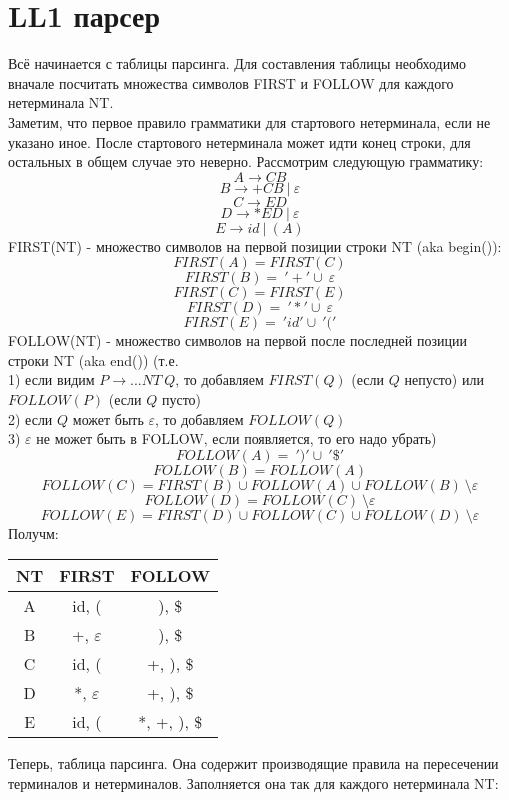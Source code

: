 \documentclass{article}
\begin{document}
\part{LL1 парсер}
Всё начинается с таблицы парсинга. Для составления таблицы необходимо вначале 
посчитать множества символов FIRST и FOLLOW для каждого нетерминала NT. 
\\Заметим, что первое правило грамматики для стартового нетерминала, 
если не указано иное. После стартового нетерминала может 
идти конец строки, для остальных в общем случае это неверно.
Рассмотрим следующую грамматику:
$$A \to CB $$
$$B \to +CB \ | \ \varepsilon $$
$$C \to ED $$
$$D \to *ED \ | \ \varepsilon$$
$$E \to id \ | \ (A)$$
FIRST(NT) - множество символов на первой позиции строки NT (aka begin()):\\
$$FIRST(A)=FIRST(C)$$
$$FIRST(B)=\ '+' \cup \ \varepsilon$$
$$FIRST(C)=FIRST(E)$$
$$FIRST(D)=\ '*' \cup \ \varepsilon$$
$$FIRST(E)=\ 'id' \cup \ '('$$
FOLLOW(NT) - множество символов на первой после последней
позиции строки NT (aka end()) (т.е.  \\ 
1) если видим $P \to ... NT \ Q$, то 
добавляем $FIRST(Q)$ (если $Q$ непусто) или $FOLLOW(P)$ (если $Q$ пусто) \\
2) если $Q$ может быть $\varepsilon$, то добавляем $FOLLOW(Q)$ \\
3) $\varepsilon$ не может быть в FOLLOW, если появляется, то его надо убрать)
$$FOLLOW(A)=\ ')' \cup \ '\$' $$
$$FOLLOW(B)=FOLLOW(A)$$
$$FOLLOW(C)=FIRST(B) \cup FOLLOW(A) \cup FOLLOW(B)\ \setminus \varepsilon$$
$$FOLLOW(D)=FOLLOW(C) \ \setminus \varepsilon$$
$$FOLLOW(E)=FIRST(D) \cup FOLLOW(C) \cup FOLLOW(D)\ \setminus \varepsilon$$
Получм:\\
\begin{center}
  \begin{tabular}{ c|c|c }
    NT & FIRST & FOLLOW         \\
    \hline
    A &  id, ( & ), \$          \\
    \hline
    B &  +, $\varepsilon$ & ), \$    \\
    \hline
    C &  id, ( & +, ), \$       \\
    \hline
    D &  *, $\varepsilon$ & +, ), \$ \\
    \hline
    E &  id, ( & *, +, ), \$ 
  \end{tabular}
\end{center}
Теперь, таблица парсинга. Она содержит производящие правила на пересечении 
терминалов и нетерминалов. Заполняется
она так для каждого нетерминала NT:\\
\end{document}

